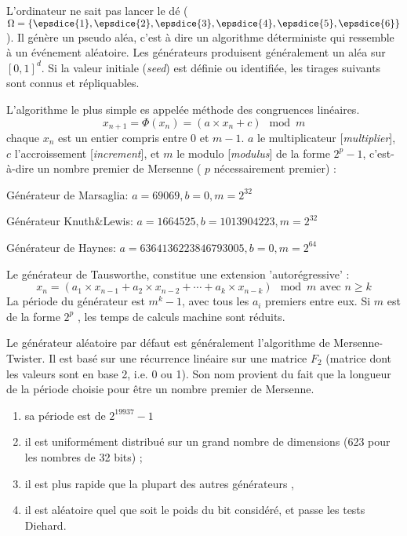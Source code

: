 \begin{f}
L'ordinateur ne sait pas lancer le dé (\(\Omega=\{ \epsdice{1}, \epsdice{2}, \epsdice{3}, \epsdice{4}, \epsdice{5}, \epsdice{6} \}\)).
Il génère un pseudo aléa, c'est à dire un algorithme déterministe qui ressemble à un événement aléatoire.
Les générateurs produisent généralement un aléa sur \([0,1]^d\).
Si la valeur initiale (\emph{seed}) est définie ou identifiée, les tirages suivants sont connus et répliquables.


L'algorithme le plus simple es  appelée méthode des congruences linéaires.
\[
x_{n+1}=\Phi(x_n)= (a\times x_n+c) \mod m
\] \small
chaque \(x_n\) est un entier compris entre 0 et \(m-1\).
\(a\) le multiplicateur [\emph{multiplier}], \(c\) l'accroissement [\emph{increment}], et \(m\) le modulo [\emph{modulus}] de la forme \(2^p-1\), c'est-à-dire un nombre premier de Mersenne ( \( p \) nécessairement premier) :

Générateur de Marsaglia: \(a=69069, b=0, m=2^{32}\)

Générateur Knuth\&Lewis: \(a=1664525, b=1013904223, m=2^{32}\)

Générateur de Haynes: \(a=6364136223846793005, b=0, m=2^{64}\)

Le générateur de Tausworthe, constitue une extension 'autorégressive' :
\[
x_{n}=(a_{1}\times x_{n-1}+a_{2}\times x_{n-2}+\cdots +a_{k}\times x_{n-k}) \mod m \text{ avec } n\geq k
\]
La période du générateur est \(m^k-1\), avec tous les \(a_i\) premiers entre eux. Si \(m\) est de la forme \(2^p\) , les temps de calculs machine sont réduits. 


Le générateur aléatoire par défaut est généralement l'algorithme de Mersenne-Twister. Il est basé sur une récurrence linéaire sur une matrice \(F_{2}\) (matrice dont les valeurs sont en base 2, i.e. 0 ou 1). 
Son nom provient du fait que la longueur de la période choisie pour être un nombre premier de Mersenne. 
\begin{enumerate}
	\item     sa période est de \(2^{19937}-1 \)
	\item     il est uniformément distribué sur un grand nombre de dimensions (623 pour les nombres de 32 bits) ;
	\item     il est plus rapide que la plupart des autres générateurs ,
	\item     il est aléatoire quel que soit le poids du bit considéré, et passe les tests Diehard.
\end{enumerate}
\end{f}
%

